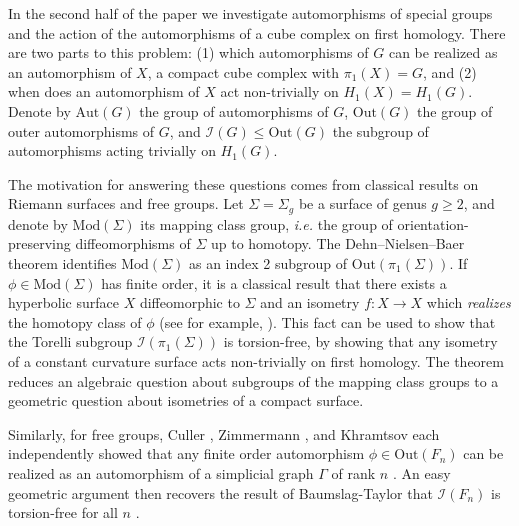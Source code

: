 \documentclass[11pt]{amsart}
\numberwithin{thm}{section}
\theoremstyle{remark}
\theoremstyle{definition}
\newcommand{\Aut}{\text{Aut}}
\newcommand{\Out}{\text{Out}}
\newcommand{\Mod}{\text{Mod}}
\newcommand{\Tor}{\mathcal{I}}
\begin{document}
In the second half of the paper we investigate automorphisms of special groups and the action of the automorphisms of a cube complex on first homology. There are two parts to this problem: (1) which automorphisms of $G$ can be realized as an automorphism of $X$, a compact cube complex with $\pi_1(X)=G$, and (2) when does an automorphism of $X$ act non-trivially on $H_1(X)=H_1(G)$.   Denote by $\Aut(G)$ the group of automorphisms of $G$, $\Out(G)$ the group of outer automorphisms of $G$, and $\Tor(G)\leq \Out(G)$ the subgroup of automorphisms acting trivially on $H_1(G)$.

The motivation for answering these questions comes from classical results on Riemann surfaces and free groups.  Let $\Sigma=\Sigma_g$ be a surface of genus $g\geq2$, and denote by $\Mod(\Sigma)$ its mapping class group, \emph{i.e.} the group of orientation-preserving diffeomorphisms of $\Sigma$ up to homotopy. The Dehn--Nielsen--Baer theorem identifies $\Mod(\Sigma)$ as an index 2 subgroup of $\Out(\pi_1(\Sigma))$. If $\phi\in \Mod(\Sigma)$ has finite order, it is a classical result that there exists a hyperbolic surface $X$ diffeomorphic to $\Sigma$ and an isometry $f:X\rightarrow X$ which \emph{realizes} the homotopy class of $\phi$ (see for example, \cite{FaMa12}).  This fact can be used to show that the Torelli subgroup $\Tor(\pi_1(\Sigma))$ is torsion-free, by showing that any isometry of a constant curvature surface acts non-trivially on first homology.  The theorem reduces an algebraic question about subgroups of the mapping class groups to a geometric question about isometries of a compact surface.  

Similarly, for free groups, Culler \cite{Cul84}, Zimmermann \cite{Zim81}, and Khramtsov \cite{Kh85} each independently showed that any finite order automorphism $\phi \in \Out(F_n)$ can be realized as an automorphism of a simplicial graph $\Gamma$ of rank $n$ . An easy geometric argument then recovers the result of Baumslag-Taylor that $\Tor(F_n)$ is torsion-free for all $n$ \cite{BaTa68}.
\end{document}
